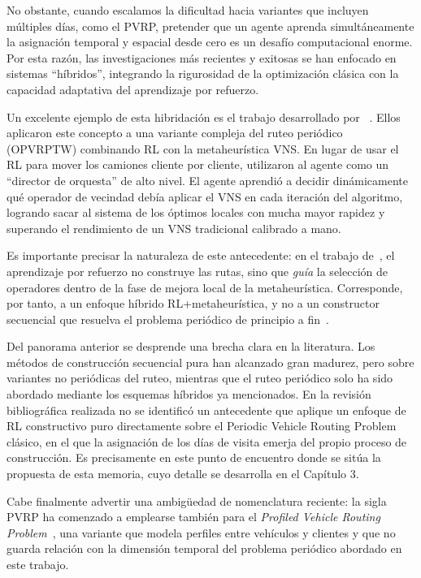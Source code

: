 No obstante, cuando escalamos la dificultad hacia variantes que incluyen múltiples días, como el PVRP, pretender que un agente aprenda simultáneamente la asignación temporal y espacial desde cero es un desafío computacional enorme. Por esta razón, las investigaciones más recientes y exitosas se han enfocado en sistemas \enquote{híbridos}, integrando la rigurosidad de la optimización clásica con la capacidad adaptativa del aprendizaje por refuerzo.

Un excelente ejemplo de esta hibridación es el trabajo desarrollado por ~\cite{Chen}. Ellos aplicaron este concepto a una variante compleja del ruteo periódico (OPVRPTW) combinando RL con la metaheurística VNS. En lugar de usar el RL para mover los camiones cliente por cliente, utilizaron al agente como un \enquote{director de orquesta} de alto nivel. El agente aprendió a decidir dinámicamente qué operador de vecindad debía aplicar el VNS en cada iteración del algoritmo, logrando sacar al sistema de los óptimos locales con mucha mayor rapidez y superando el rendimiento de un VNS tradicional calibrado a mano.

Es importante precisar la naturaleza de este antecedente: en el trabajo de~\cite{Chen}, el aprendizaje por refuerzo no construye las rutas, sino que \textit{guía} la selección de operadores dentro de la fase de mejora local de la metaheurística. Corresponde, por tanto, a un enfoque híbrido RL+metaheurística, y no a un constructor secuencial que resuelva el problema periódico de principio a fin~\cite{Shahbazian2024}.

Del panorama anterior se desprende una brecha clara en la literatura. Los métodos de construcción secuencial pura han alcanzado gran madurez, pero sobre variantes no periódicas del ruteo, mientras que el ruteo periódico solo ha sido abordado mediante los esquemas híbridos ya mencionados. En la revisión bibliográfica realizada no se identificó un antecedente que aplique un enfoque de RL constructivo puro directamente sobre el Periodic Vehicle Routing Problem clásico, en el que la asignación de los días de visita emerja del propio proceso de construcción. Es precisamente en este punto de encuentro donde se sitúa la propuesta de esta memoria, cuyo detalle se desarrolla en el Capítulo 3.

Cabe finalmente advertir una ambigüedad de nomenclatura reciente: la sigla PVRP ha comenzado a emplearse también para el \textit{Profiled Vehicle Routing Problem}~\cite{Hua2025CAMP}, una variante que modela perfiles entre vehículos y clientes y que no guarda relación con la dimensión temporal del problema periódico abordado en este trabajo.

